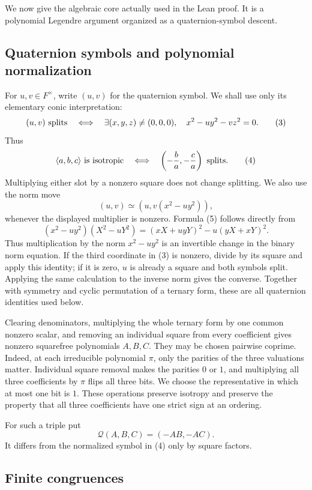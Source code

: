 \documentclass[uplatex,dvipdfmx]{jsarticle}
\theoremstyle{definition}
\theoremstyle{remark}
\begin{document}
We now give the algebraic core actually used in the Lean proof.  It is a
polynomial Legendre argument organized as a quaternion-symbol descent.

\subsection{Quaternion symbols and polynomial normalization}

For $u,v\in F^\times$, write $(u,v)$ for the quaternion symbol.  We shall use
only its elementary conic interpretation:
\[
 (u,v)\ \hbox{splits}
 \quad\Longleftrightarrow\quad
 \exists (x,y,z)\ne(0,0,0),\quad x^2-u y^2-v z^2=0.       \tag{3}
\]
Thus
\[
 \langle a,b,c\rangle\ \hbox{is isotropic}
 \quad\Longleftrightarrow\quad
 \left(-\frac ba,-\frac ca\right)\ \hbox{splits}.         \tag{4}
\]
Multiplying either slot by a nonzero square does not change splitting.
We also use the norm move
\[
 (u,v)\simeq (u,v(x^2-u y^2)),                            \tag{5}
\]
whenever the displayed multiplier is nonzero.  Formula (5) follows directly
from
\[
 (x^2-u y^2)(X^2-uY^2)
   =(xX+u yY)^2-u(yX+xY)^2.
\]
Thus multiplication by the norm $x^2-u y^2$ is an invertible change in the
binary norm equation.  If the third coordinate in (3) is nonzero, divide by
its square and apply this identity; if it is zero, $u$ is already a square
and both symbols split.  Applying the same calculation to the inverse norm
gives the converse.
Together with symmetry and cyclic permutation of a ternary form, these are
all quaternion identities used below.

Clearing denominators, multiplying the whole ternary form by one common
nonzero scalar, and removing an individual square from every coefficient
gives nonzero squarefree polynomials $A,B,C$.  They may be chosen pairwise
coprime.  Indeed, at each irreducible polynomial $\pi$, only the parities of
the three valuations matter.  Individual square removal makes the parities
$0$ or $1$, and multiplying all three coefficients by $\pi$ flips all three
bits.  We choose the representative in which at most one bit is $1$.
These operations preserve isotropy and preserve the property that all three
coefficients have one strict sign at an ordering.

For such a triple put
\[
  \mathcal Q(A,B,C)=(-AB,-AC).
\]
It differs from the normalized symbol in (4) only by square factors.

\subsection{Finite congruences}
\end{document}
